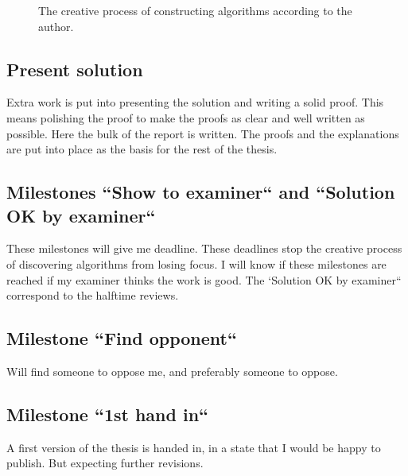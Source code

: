 \documentclass[msc,lith,english]{liuthesis}
\begin{document}
\begin{center}
\begin{figure}[h!]
\centering
{}
\caption{The creative process of constructing algorithms according to the author.}
\label{figCreativeProcess}
\end{figure}
\end{center}

\subsection{Present solution}
Extra work is put into presenting the solution and writing a solid proof.
This means polishing the proof to make the proofs as clear and well written as possible.
Here the bulk of the report is written.
The proofs and the explanations are put into place as the basis for the rest of the thesis.

\subsection{Milestones ``Show to examiner`` and ``Solution OK by examiner``}
These milestones will give me deadline.
These deadlines stop the creative process of discovering algorithms from losing focus.
I will know if these milestones are reached if my examiner thinks the work is good.
The `Solution OK by examiner`` correspond to the halftime reviews.

\subsection{Milestone ``Find opponent``}
Will find someone to oppose me, and preferably someone to oppose. 

\subsection{Milestone ``1st hand in``}
A first version of the thesis is handed in, in a state that I would be happy to
publish. But expecting further revisions.
\end{document}
